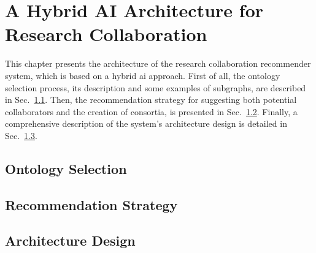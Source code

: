 \chapter{A Hybrid AI Architecture for Research Collaboration}\label{chap:Knowledge-DrivenArchitecture}
This chapter presents the architecture of the research collaboration recommender system, which is based on a hybrid \gls{ai} approach.
First of all, the ontology selection process, its description and some examples of subgraphs, are described in Sec.~\ref{sec:ontology-selection}.
Then, the recommendation strategy for suggesting both potential collaborators and the creation of consortia, is presented in Sec.~\ref{sec:recommendation-strategy}.
Finally, a comprehensive description of the system's architecture design is detailed in Sec.~\ref{sec:architecture-design}.
%
\section{Ontology Selection}\label{sec:ontology-selection}

%
\section{Recommendation Strategy}\label{sec:recommendation-strategy}

%
\section{Architecture Design}\label{sec:architecture-design}
